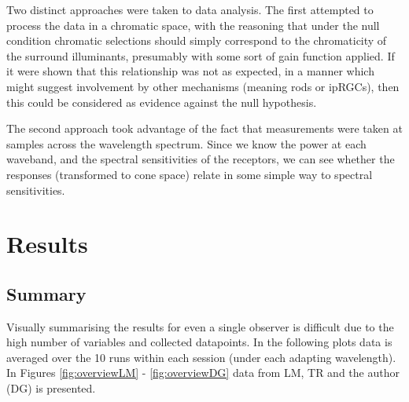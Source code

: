
Two distinct approaches were taken to data analysis. The first attempted to process the data in a chromatic space, with the reasoning that under the null condition chromatic selections should simply correspond to the chromaticity of the surround illuminants, presumably with some sort of gain function applied. If it were shown that this relationship was not as expected, in a manner which might suggest involvement by other mechanisms (meaning rods or \glspl{ipRGC}), then this could be considered as evidence against the null hypothesis.

The second approach took advantage of the fact that measurements were taken at samples across the wavelength spectrum. Since we know the power at each waveband, and the spectral sensitivities of the receptors, we can see whether the responses (transformed to cone space) relate in some simple way to spectral sensitivities.


\section{Results}

\subsection{Summary}

Visually summarising the results for even a single observer is difficult due to the high number of variables and collected datapoints. In the following plots data is averaged over the 10 runs within each session (under each adapting wavelength). In Figures \ref{fig:overviewLM} - \ref{fig:overviewDG} data from LM, TR and the author (DG) is presented.

